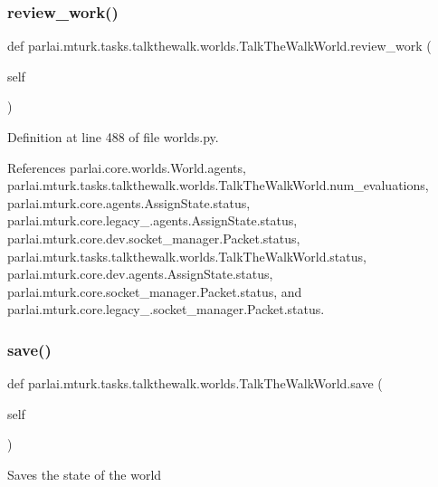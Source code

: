 \subsubsection{\texorpdfstring{review\+\_\+work()}{review\_work()}}
{\footnotesize\ttfamily def parlai.\+mturk.\+tasks.\+talkthewalk.\+worlds.\+Talk\+The\+Walk\+World.\+review\+\_\+work (\begin{DoxyParamCaption}\item[{}]{self }\end{DoxyParamCaption})}



Definition at line 488 of file worlds.\+py.



References parlai.\+core.\+worlds.\+World.\+agents, parlai.\+mturk.\+tasks.\+talkthewalk.\+worlds.\+Talk\+The\+Walk\+World.\+num\+\_\+evaluations, parlai.\+mturk.\+core.\+agents.\+Assign\+State.\+status, parlai.\+mturk.\+core.\+legacy\+\_.\+agents.\+Assign\+State.\+status, parlai.\+mturk.\+core.\+dev.\+socket\+\_\+manager.\+Packet.\+status, parlai.\+mturk.\+tasks.\+talkthewalk.\+worlds.\+Talk\+The\+Walk\+World.\+status, parlai.\+mturk.\+core.\+dev.\+agents.\+Assign\+State.\+status, parlai.\+mturk.\+core.\+socket\+\_\+manager.\+Packet.\+status, and parlai.\+mturk.\+core.\+legacy\+\_.\+socket\+\_\+manager.\+Packet.\+status.

\mbox{\label{classparlai_1_1mturk_1_1tasks_1_1talkthewalk_1_1worlds_1_1TalkTheWalkWorld_a7ae3bea4994385c3b1222dbab5e7f88f}} 
\subsubsection{\texorpdfstring{save()}{save()}}
{\footnotesize\ttfamily def parlai.\+mturk.\+tasks.\+talkthewalk.\+worlds.\+Talk\+The\+Walk\+World.\+save (\begin{DoxyParamCaption}\item[{}]{self }\end{DoxyParamCaption})}

\begin{DoxyVerb}Saves the state of the world\end{DoxyVerb}
 

